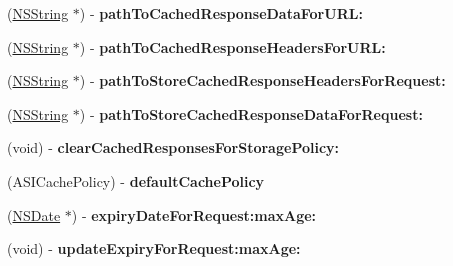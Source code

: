 \begin{DoxyCompactItemize}
\item 
\hypertarget{protocol_a_s_i_cache_delegate-p_a692463be3a5c9abe5a239eb761431799}{
(\hyperlink{class_n_s_string}{\-N\-S\-String} $\ast$) -\/ {\bfseries path\-To\-Cached\-Response\-Data\-For\-U\-R\-L\-:}}
\label{protocol_a_s_i_cache_delegate-p_a692463be3a5c9abe5a239eb761431799}

\item 
\hypertarget{protocol_a_s_i_cache_delegate-p_a0cab288cf23b1d6adb76981ed591d324}{
(\hyperlink{class_n_s_string}{\-N\-S\-String} $\ast$) -\/ {\bfseries path\-To\-Cached\-Response\-Headers\-For\-U\-R\-L\-:}}
\label{protocol_a_s_i_cache_delegate-p_a0cab288cf23b1d6adb76981ed591d324}

\item 
\hypertarget{protocol_a_s_i_cache_delegate-p_ab9a190279d92a9fc5d7efeff1efad0ad}{
(\hyperlink{class_n_s_string}{\-N\-S\-String} $\ast$) -\/ {\bfseries path\-To\-Store\-Cached\-Response\-Headers\-For\-Request\-:}}
\label{protocol_a_s_i_cache_delegate-p_ab9a190279d92a9fc5d7efeff1efad0ad}

\item 
\hypertarget{protocol_a_s_i_cache_delegate-p_ab7f2a212c2d6391b1d9fb7a8da9f2c39}{
(\hyperlink{class_n_s_string}{\-N\-S\-String} $\ast$) -\/ {\bfseries path\-To\-Store\-Cached\-Response\-Data\-For\-Request\-:}}
\label{protocol_a_s_i_cache_delegate-p_ab7f2a212c2d6391b1d9fb7a8da9f2c39}

\item 
\hypertarget{protocol_a_s_i_cache_delegate-p_abb2c511be4be2274bd3e812ea978e2a6}{
(void) -\/ {\bfseries clear\-Cached\-Responses\-For\-Storage\-Policy\-:}}
\label{protocol_a_s_i_cache_delegate-p_abb2c511be4be2274bd3e812ea978e2a6}

\item 
\hypertarget{protocol_a_s_i_cache_delegate-p_a1207aea079945294e7bb48c621d82a67}{
(\-A\-S\-I\-Cache\-Policy) -\/ {\bfseries default\-Cache\-Policy}}
\label{protocol_a_s_i_cache_delegate-p_a1207aea079945294e7bb48c621d82a67}

\item 
\hypertarget{protocol_a_s_i_cache_delegate-p_a36d0b83c9017dba94a93acc3cae9aa65}{
(\hyperlink{class_n_s_date}{\-N\-S\-Date} $\ast$) -\/ {\bfseries expiry\-Date\-For\-Request\-:max\-Age\-:}}
\label{protocol_a_s_i_cache_delegate-p_a36d0b83c9017dba94a93acc3cae9aa65}

\item 
\hypertarget{protocol_a_s_i_cache_delegate-p_ad793f424847f6f7a2c5154fb8cec1bb6}{
(void) -\/ {\bfseries update\-Expiry\-For\-Request\-:max\-Age\-:}}
\label{protocol_a_s_i_cache_delegate-p_ad793f424847f6f7a2c5154fb8cec1bb6}


\end{DoxyCompactItemize}
